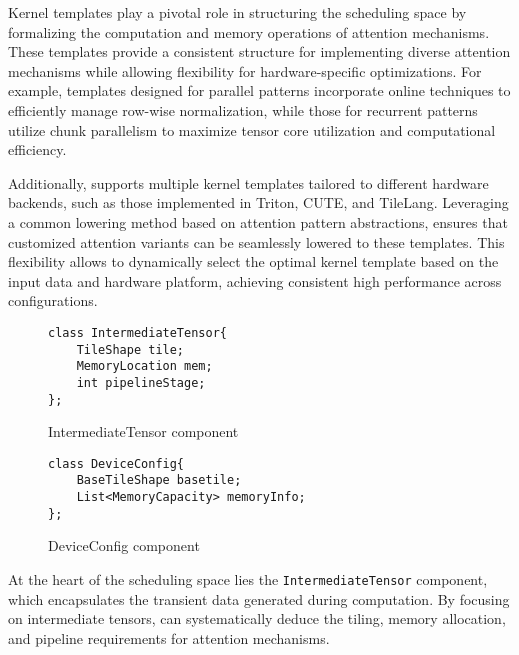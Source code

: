 Kernel templates play a pivotal role in structuring the scheduling space by formalizing the computation and memory operations of attention mechanisms. These templates provide a consistent structure for implementing diverse attention mechanisms while allowing flexibility for hardware-specific optimizations. For example, templates designed for parallel patterns incorporate online techniques to efficiently manage row-wise normalization, while those for recurrent patterns utilize chunk parallelism to maximize tensor core utilization and computational efficiency.

Additionally, \oursys{} supports multiple kernel templates tailored to different hardware backends, such as those implemented in Triton\cite{triton}, CUTE\cite{nvidia2024cutlass}, and TileLang\cite{tilelang}. Leveraging a common lowering method based on attention pattern abstractions, \oursys{} ensures that customized attention variants can be seamlessly lowered to these templates. This flexibility allows \oursys{} to dynamically select the optimal kernel template based on the input data and hardware platform, achieving consistent high performance across configurations.

\begin{figure}[t]
\begin{lstlisting}
class IntermediateTensor{
    TileShape tile;
    MemoryLocation mem;
    int pipelineStage;
};
\end{lstlisting}
  \vspace{-3mm}
\caption{IntermediateTensor component}
  \vspace{-5mm}
\label{fig:intermediate-tensor}
\end{figure}

\begin{figure}[t]
\begin{lstlisting}
class DeviceConfig{
    BaseTileShape basetile;
    List<MemoryCapacity> memoryInfo;
};
\end{lstlisting}
  \vspace{-3mm}
\caption{DeviceConfig component}
  \vspace{-5mm}
\label{fig:device-config}
\end{figure}

At the heart of the scheduling space lies the \texttt{IntermediateTensor} component, which encapsulates the transient data generated during computation. By focusing on intermediate tensors, \oursys{} can systematically deduce the tiling, memory allocation, and pipeline requirements for attention mechanisms.

